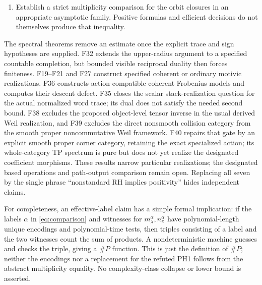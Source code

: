 \begin{enumerate}
\item {} Establish a strict multiplicity comparison for the orbit closures in an appropriate asymptotic family. Positive formulas and efficient decisions do not themselves produce that inequality.
\end{enumerate}
The spectral theorems remove an estimate once the explicit trace and sign hypotheses are supplied. F32 extends the upper-radius argument to a specified countable completion, but bounded visible reciprocal duality then forces finiteness. F19--F21 and F27 construct specified coherent or ordinary motivic realizations. F36 constructs action-compatible coherent Frobenius models and computes their descent defect. F35 closes the scalar stack-realization question for the actual normalized word trace; its dual does not satisfy the needed second bound. F38 excludes the proposed object-level tensor inverse in the usual derived Weil realization, and F39 excludes the direct nonsmooth collision category from the smooth proper noncommutative Weil framework. F40 repairs that gate by an explicit smooth proper corner category, retaining the exact specialized action; its whole-category TP spectrum is pure but does not yet realize the designated coefficient morphisms. These results narrow particular realizations; the designated based operations and path-output comparison remain open. Replacing all seven by the single phrase ``nonstandard RH implies positivity'' hides independent claims.

For completeness, an effective-label claim has a simple formal implication: if the labels $\alpha$ in \eqref{eq:comparison} and witnesses for $m_\lambda^\alpha,n_\pi^\alpha$ have polynomial-length unique encodings and polynomial-time tests, then triples consisting of a label and the two witnesses count the sum of products. A nondeterministic machine guesses and checks the triple, giving a \(\#P\) function. This is just the definition of \(\#P\); neither the encodings nor a replacement for the refuted PH1 follows from the abstract multiplicity equality. No complexity-class collapse or lower bound is asserted.

